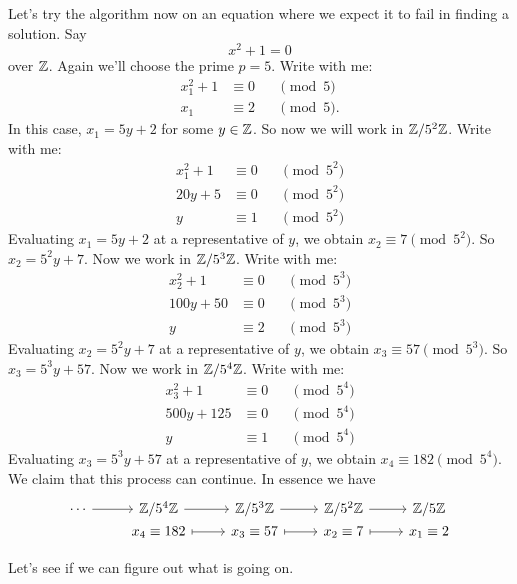 \documentclass{ximera}
\begin{document}
Let's try the algorithm now on an equation where we expect it to fail
in finding a solution. Say
\[
x^2 +  1 = 0
\]
over $\mathbb Z$. Again we'll choose the prime $p=5$. Write with me:
\begin{align*}
  x_1^2+1 &\equiv 0&&\pmod{5}\\
  x_1 &\equiv 2 &&\pmod{5}.
\end{align*}
In this case, $x_1 = 5y + 2$ for some $y\in \mathbb Z$. So now we will work
in $\mathbb Z/5^2\mathbb Z$. Write with me:
\begin{align*}
  x_1^2+1 &\equiv 0&&\pmod{5^2}\\
  20y+5 &\equiv 0 &&\pmod{5^2}\\
  y &\equiv 1 &&\pmod{5^2}
\end{align*}
Evaluating $x_1 = 5 y+2$ at a representative of $y$, we obtain $x_2
\equiv 7\pmod{5^2}$. So $x_2 = 5^2 y +7$. Now we work in
$\mathbb Z/5^3\mathbb Z$. Write with me:
\begin{align*}
  x_2^2+1 &\equiv 0&&\pmod{5^3}\\
  100y+50 &\equiv 0 &&\pmod{5^3}\\
  y &\equiv 2 &&\pmod{5^3}
\end{align*}
Evaluating $x_2 = 5^2 y+7$ at a representative of $y$, we obtain $x_3
\equiv 57\pmod{5^3}$. So $x_3 = 5^3 y +57$. Now we work in
$\mathbb Z/5^4\mathbb Z$. Write with me:
\begin{align*}
  x_3^2+1 &\equiv 0&&\pmod{5^4}\\
  500y+125 &\equiv 0 &&\pmod{5^4}\\
  y &\equiv 1 &&\pmod{5^4}
\end{align*}
Evaluating $x_3 = 5^3 y+57$ at a representative of $y$, we obtain $x_4
\equiv 182\pmod{5^4}$.  We claim that this process can continue. In
essence we have
\[
\begin{tikzcd}[row sep=0em,]
  \cdots \ar[r] & \Z/5^4\Z \ar[r] & \Z/5^3\Z \ar[r] & \Z/5^2\Z \ar[r] & \Z/5\Z \\
  & x_4\equiv 182 \ar[r,mapsto] & x_3\equiv 57 \ar[r,mapsto] & x_2\equiv 7 \ar[r,mapsto] &  x_1\equiv 2
\end{tikzcd}
\]

Let's see if we can figure out what is going on.
\end{document}
